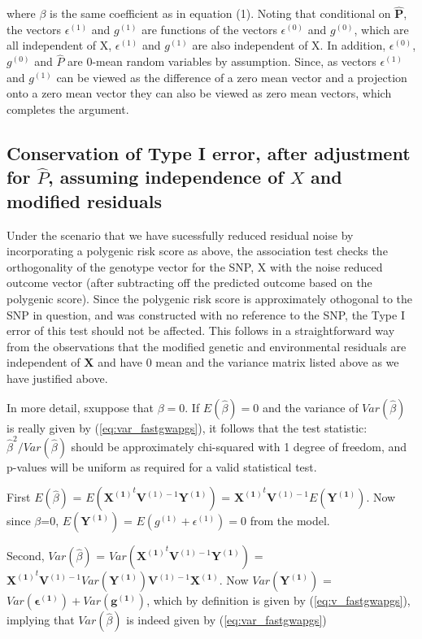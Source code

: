 \documentclass[10pt]{article}
\begin{document}
where $\beta$ is the same coefficient as in equation (1).  Noting that conditional on $\mathbf{\hat{P}}$, the vectors $\epsilon^{(1)}$ and $g^{(1)}$ are functions of the vectors $\epsilon^{(0)}$ and  $g^{(0)}$, which are all independent of X, $\epsilon^{(1)}$ and $g^{(1)}$ are also independent of X.  In addition, $\epsilon^{(0)}$, $g^{(0)}$ and $\hat{P}$ are 0-mean random variables by assumption.  Since,  as vectors $\epsilon^{(1)}$ and  $g^{(1)}$ can be viewed as the difference of a zero mean vector and a projection onto a zero mean vector they can also be viewed as zero mean vectors, which completes the argument. 

\subsection*{Conservation of Type I error, after adjustment for $\hat{P}$, assuming independence of $X$ and modified residuals}
Under the scenario that we have sucessfully reduced residual noise by incorporating a polygenic risk score as above, the association test checks the orthogonality of the genotype vector for the SNP, X with the noise reduced outcome vector (after subtracting off the predicted outcome based on the polygenic score).  Since the polygenic risk score is approximately othogonal to the SNP in question, and was constructed with no reference to the SNP, the Type I error of this test should not be affected.  This follows in a straightforward way from the observations that the modified genetic and environmental residuals are independent of $\mathbf{X}$ and have 0 mean and the variance matrix listed above as we have justified above. 

In more detail, sxuppose that $\beta = 0$.  If $E(\hat{\beta}) = 0$ and the variance of $Var(\hat{\beta})$ is really given by (\ref{eq:var_fastgwapgs}), it follows that the test statistic: $\hat{\beta}^2/Var(\hat{\beta})$ should be approximately chi-squared with 1 degree of freedom, and p-values will be uniform as required for a valid statistical test.

First $E(\hat{\beta})$ = $E( \mathbf{X^{(1)}}^t \mathbf{V}^{(1)-1} \mathbf{Y^{(1)}})$ = $\mathbf{X^{(1)}}^t \mathbf{V}^{(1)-1} E(\mathbf{Y^{(1)}})$.   Now since $\beta$=0,  $E(\mathbf{Y^{(1)}})$ = $E(g^{(1)}+\epsilon^{(1)}) = 0$ from the model.  

Second, $Var(\hat{\beta})$ =  $Var( \mathbf{X^{(1)}}^t \mathbf{V}^{(1)-1} \mathbf{Y^{(1)}})$ = $ \mathbf{X^{(1)}}^t \mathbf{V}^{(1)-1} Var(\mathbf{Y^{(1)}}) \mathbf{V}^{(1)-1} \mathbf{X^{(1)}}$.  Now $Var(\mathbf{Y^{(1)}})$ = $Var(\mathbf{\epsilon^{(1)}})+Var(\mathbf{g^{(1)}})$, which by definition is given by (\ref{eq:v_fastgwapgs}), implying that  $Var(\hat{\beta})$ is indeed given by (\ref{eq:var_fastgwapgs})
\newpage
\end{document}
